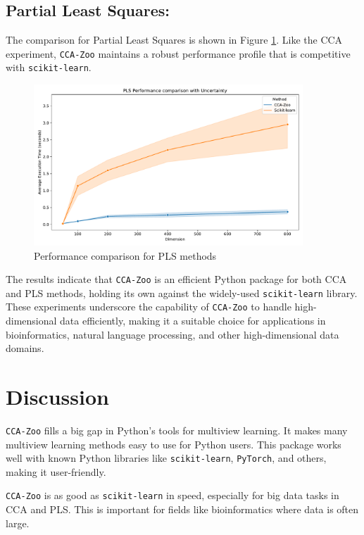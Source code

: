 \subsection{Partial Least Squares:}
The comparison for Partial Least Squares is shown in Figure \ref{fig:pls_benchmark}.
Like the CCA experiment, \texttt{CCA-Zoo} maintains a robust performance profile that is competitive with \texttt{scikit-learn}.

\begin{figure}[h]
    \centering
    \includegraphics[width=0.9\textwidth]{figures/PLS_Speed_Benchmark}
    \caption{Performance comparison for PLS methods}
    \label{fig:pls_benchmark}
\end{figure}

The results indicate that \texttt{CCA-Zoo} is an efficient Python package for both CCA and PLS methods, holding its own against the widely-used \texttt{scikit-learn} library.
These experiments underscore the capability of \texttt{CCA-Zoo} to handle high-dimensional data efficiently, making it a suitable choice for applications in bioinformatics, natural language processing, and other high-dimensional data domains.

\section{Discussion}

\texttt{CCA-Zoo} fills a big gap in Python's tools for multiview learning.
It makes many multiview learning methods easy to use for Python users.
This package works well with known Python libraries like \texttt{scikit-learn}, \texttt{PyTorch}, and others, making it user-friendly.

\texttt{CCA-Zoo} is as good as \texttt{scikit-learn} in speed, especially for big data tasks in CCA and PLS. This is important for fields like bioinformatics where data is often large.

